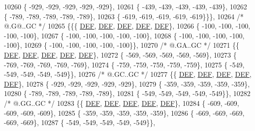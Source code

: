 \begin{DoxyCode}
10260 \{ -929, -929, -929, -929, -929\},
10261 \{ -439, -439, -439, -439, -439\},
10262 \{ -789, -789, -789, -789, -789\},
10263 \{ -619, -619, -619, -619, -619\}\}\},
10264 \textcolor{comment}{/*  @.G@..GC */}
10265 \{\{\{  \mbox{\hyperlink{1_88_84__epars_8h_a397419fc12b37ed479c8abb9d444d843}{DEF}},  \mbox{\hyperlink{1_88_84__epars_8h_a397419fc12b37ed479c8abb9d444d843}{DEF}},  \mbox{\hyperlink{1_88_84__epars_8h_a397419fc12b37ed479c8abb9d444d843}{DEF}},  \mbox{\hyperlink{1_88_84__epars_8h_a397419fc12b37ed479c8abb9d444d843}{DEF}},  \mbox{\hyperlink{1_88_84__epars_8h_a397419fc12b37ed479c8abb9d444d843}{DEF}}\},
10266 \{ -100, -100, -100, -100, -100\},
10267 \{ -100, -100, -100, -100, -100\},
10268 \{ -100, -100, -100, -100, -100\},
10269 \{ -100, -100, -100, -100, -100\}\},
10270 \textcolor{comment}{/*  @.GA..GC */}
10271 \{\{  \mbox{\hyperlink{1_88_84__epars_8h_a397419fc12b37ed479c8abb9d444d843}{DEF}},  \mbox{\hyperlink{1_88_84__epars_8h_a397419fc12b37ed479c8abb9d444d843}{DEF}},  \mbox{\hyperlink{1_88_84__epars_8h_a397419fc12b37ed479c8abb9d444d843}{DEF}},  \mbox{\hyperlink{1_88_84__epars_8h_a397419fc12b37ed479c8abb9d444d843}{DEF}},  \mbox{\hyperlink{1_88_84__epars_8h_a397419fc12b37ed479c8abb9d444d843}{DEF}}\},
10272 \{ -569, -569, -569, -569, -569\},
10273 \{ -769, -769, -769, -769, -769\},
10274 \{ -759, -759, -759, -759, -759\},
10275 \{ -549, -549, -549, -549, -549\}\},
10276 \textcolor{comment}{/*  @.GC..GC */}
10277 \{\{  \mbox{\hyperlink{1_88_84__epars_8h_a397419fc12b37ed479c8abb9d444d843}{DEF}},  \mbox{\hyperlink{1_88_84__epars_8h_a397419fc12b37ed479c8abb9d444d843}{DEF}},  \mbox{\hyperlink{1_88_84__epars_8h_a397419fc12b37ed479c8abb9d444d843}{DEF}},  \mbox{\hyperlink{1_88_84__epars_8h_a397419fc12b37ed479c8abb9d444d843}{DEF}},  \mbox{\hyperlink{1_88_84__epars_8h_a397419fc12b37ed479c8abb9d444d843}{DEF}}\},
10278 \{ -929, -929, -929, -929, -929\},
10279 \{ -359, -359, -359, -359, -359\},
10280 \{ -789, -789, -789, -789, -789\},
10281 \{ -549, -549, -549, -549, -549\}\},
10282 \textcolor{comment}{/*  @.GG..GC */}
10283 \{\{  \mbox{\hyperlink{1_88_84__epars_8h_a397419fc12b37ed479c8abb9d444d843}{DEF}},  \mbox{\hyperlink{1_88_84__epars_8h_a397419fc12b37ed479c8abb9d444d843}{DEF}},  \mbox{\hyperlink{1_88_84__epars_8h_a397419fc12b37ed479c8abb9d444d843}{DEF}},  \mbox{\hyperlink{1_88_84__epars_8h_a397419fc12b37ed479c8abb9d444d843}{DEF}},  \mbox{\hyperlink{1_88_84__epars_8h_a397419fc12b37ed479c8abb9d444d843}{DEF}}\},
10284 \{ -609, -609, -609, -609, -609\},
10285 \{ -359, -359, -359, -359, -359\},
10286 \{ -669, -669, -669, -669, -669\},
10287 \{ -549, -549, -549, -549, -549\}\},

\end{DoxyCode}
